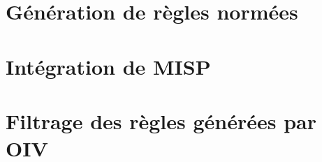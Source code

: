 \label{chap3:intro}
{\fontsize{14pt}{16pt}\selectfont
    
}

\newpage

\section{Génération de règles normées}
\label{chap3:section1}
{\fontsize{14pt}{16pt}\selectfont
    
}

\newpage

\section{Intégration de MISP}
\label{chap3:section2}
{\fontsize{14pt}{16pt}\selectfont
    
}

\newpage

\section{Filtrage des règles générées par OIV}
\label{chap3:section3}
{\fontsize{14pt}{16pt}\selectfont
    
}